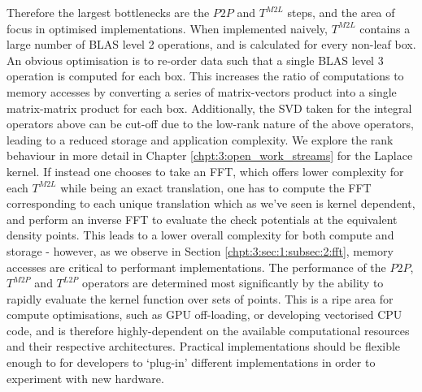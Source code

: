 Therefore the largest bottlenecks are the $P2P$ and $T^{M2L}$ steps, and the area of focus in optimised implementations. When implemented naively, $T^{M2L}$ contains a large number of BLAS level 2 operations, and is calculated for every non-leaf box. An obvious optimisation is to re-order data such that a single BLAS level 3 operation is computed for each box. This increases the ratio of computations to memory accesses by converting a series of matrix-vectors product into a single matrix-matrix product for each box. Additionally, the SVD taken for the integral operators above can be cut-off due to the low-rank nature of the above operators, leading to a reduced storage and application complexity. We explore the rank behaviour in more detail in Chapter \ref{chpt:3:open_work_streams} for the Laplace kernel. If instead one chooses to take an FFT, which offers lower complexity for each $T^{M2L}$ while being an exact translation, one has to compute the FFT corresponding to each unique translation which as we've seen is kernel dependent, and perform an inverse FFT to evaluate the check potentials at the equivalent density points. This leads to a lower overall complexity for both compute and storage - however, as we observe in Section \ref{chpt:3:sec:1:subsec:2:fft}, memory accesses are critical to performant implementations. The performance of the $P2P$, $T^{M2P}$ and $T^{L2P}$ operators are determined most significantly by the ability to rapidly evaluate the kernel function over sets of points. This is a ripe area for compute optimisations, such as GPU off-loading, or developing vectorised CPU code, and is therefore highly-dependent on the available computational resources and their respective architectures. Practical implementations should be flexible enough to for developers to `plug-in' different implementations in order to experiment with new hardware.

